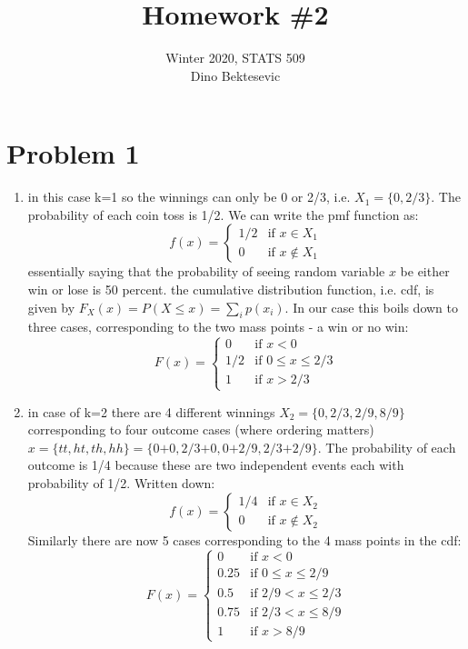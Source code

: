 \documentclass{article}
\date{{}}
\newcommand{\1}{\mathbf{1}}
\begin{document}
\title{Homework \#2}
\author{\normalsize{Winter 2020, STATS 509}\\
\normalsize{Dino Bektesevic}}
\maketitle

\section*{Problem 1}
\begin{enumerate}
	\item in this case k=1 so the winnings can only be 0 or 2/3, i.e. $X_1=\{0, 2/3\}$. The probability of each coin toss is 1/2. We can write the pmf function as:
	$$f(x) = \begin{cases} 
	        1/2 &\mbox{if } x \in X_1 \\
            0 & \mbox{if } x \notin X_1 
        \end{cases} 
    $$
    essentially saying that the probability of seeing random variable $x$ be either win or lose is 50 percent. the cumulative distribution function, i.e. cdf, is given by $F_X(x) = P(X\leq x) = \sum_i p(x_i)$. In our case this boils down to three cases, corresponding to the two mass points - a win or no win:
	$$F(x) = \begin{cases} 
	        0 &\mbox{if } x < 0 \\
	        1/2 &\mbox{if } 0 \leq x \leq 2/3 \\
            1 & \mbox{if } x > 2/3 
        \end{cases} 
    $$

    \item in case of k=2 there are 4 different winnings $X_2=\{0, 2/3, 2/9, 8/9\}$ corresponding to four outcome cases (where ordering matters) $x=\{tt, ht, th, hh\} = \{\mbox{0+0}, \mbox{2/3+0}, \mbox{0+2/9}, \mbox{2/3+2/9}\}$. The probability of each outcome is 1/4 because these are two independent events each with probability of 1/2. Written down:
    $$f(x) = \begin{cases} 
	        1/4 &\mbox{if } x \in X_2 \\
            0 & \mbox{if } x \notin X_2 
        \end{cases} 
    $$
	Similarly there are now 5 cases corresponding to the 4 mass points in the cdf:
	$$F(x) = \begin{cases} 
	        0 &\mbox{if } x < 0 \\
	        0.25 &\mbox{if } 0\leq x \leq 2/9 \\
            0.5  & \mbox{if } 2/9 < x \leq 2/3 \\
            0.75 & \mbox{if } 2/3 < x \leq 8/9 \\
            1 & \mbox{if } x > 8/9
        \end{cases} 
    $$
	

\end{enumerate}
\end{document}
